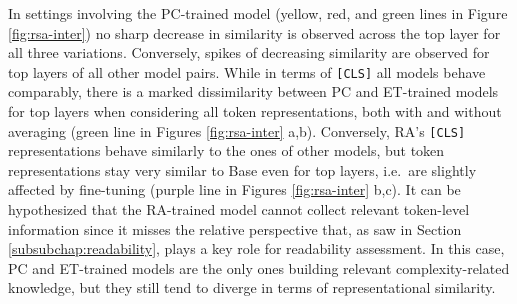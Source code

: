 \documentclass[a4paper, nobind]{templates/ociamthesis}
\begin{document}
In settings involving the PC-trained model (yellow, red, and green lines in Figure \ref{fig:rsa-inter}) no sharp decrease in similarity is observed across the top layer for all three variations. Conversely, spikes of decreasing similarity are observed for top layers of all other model pairs. While in terms of \texttt{{[}CLS{]}} all models behave comparably, there is a marked dissimilarity between PC and ET-trained models for top layers when considering all token representations, both with and without averaging (green line in Figures \ref{fig:rsa-inter} a,b). Conversely, RA's \texttt{{[}CLS{]}} representations behave similarly to the ones of other models, but token representations stay very similar to Base even for top layers, i.e.~are slightly affected by fine-tuning (purple line in Figures \ref{fig:rsa-inter} b,c). It can be hypothesized that the RA-trained model cannot collect relevant token-level information since it misses the relative perspective that, as saw in Section \ref{subsubchap:readability}, plays a key role for readability assessment. In this case, PC and ET-trained models are the only ones building relevant complexity-related knowledge, but they still tend to diverge in terms of representational similarity.
\end{document}

